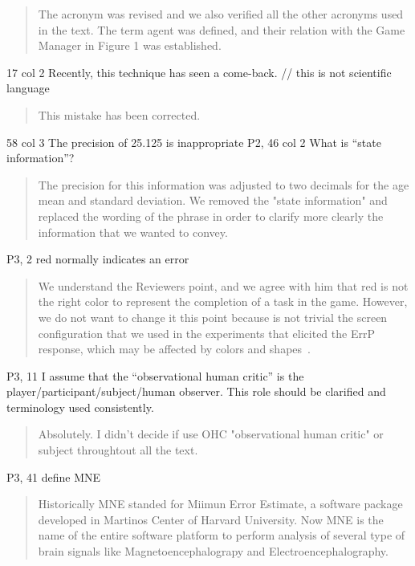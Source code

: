 \documentclass[journal,onecolumn,12pt]{IEEEtran}
\begin{document}
\begin{quotation}
{\color{blue}
The acronym was revised and we also verified all the other acronyms used in the text.  The term agent was defined, and their relation with the Game Manager in Figure 1 was established.
}
\end{quotation}

17 col 2 Recently, this technique has seen a come-back. // this is not scientific language

\begin{quotation}
{\color{blue}
This mistake has been corrected.
}
\end{quotation}

58 col 3 The precision of 25.125 is inappropriate P2, 46 col 2 What is “state information”?

\begin{quotation}
{\color{blue}
The precision for this information was adjusted to two decimals for the age mean and standard deviation.  We removed the "state information" and replaced the wording of the phrase in order to clarify more clearly the information that we wanted to convey.
}
\end{quotation}

P3, 2 red normally indicates an error

\begin{quotation}
{\color{blue}
We understand the Reviewers point, and we agree with him that red is not the right color to represent the completion of a task in the game.  However, we do not want to change it this point because is not trivial the screen configuration that we used in the experiments that elicited the ErrP response, which may be affected by colors and shapes~\cite{REF}.
}
\end{quotation}

P3, 11 I assume that the “observational human critic” is the player/participant/subject/human observer. This role should be clarified and terminology used consistently.

\begin{quotation}
{\color{blue}
Absolutely.  I didn't decide if use OHC "observational human critic" or subject throughtout all the text.
}
\end{quotation}

P3, 41 define MNE

\begin{quotation}
{\color{blue}
Historically MNE standed for Miimun Error Estimate, a software package developed in Martinos Center of Harvard University.  Now MNE  is the name of the entire software platform to perform analysis of several type of brain signals like Magnetoencephalograpy and Electroencephalography.
}
\end{quotation}
\end{document}
